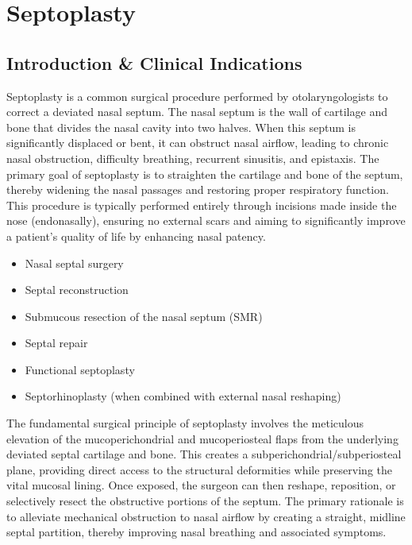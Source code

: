 \chapter{Septoplasty}

\section*{Introduction \& Clinical Indications}
Septoplasty is a common surgical procedure performed by otolaryngologists to correct a deviated nasal septum. The nasal septum is the wall of cartilage and bone that divides the nasal cavity into two halves. When this septum is significantly displaced or bent, it can obstruct nasal airflow, leading to chronic nasal obstruction, difficulty breathing, recurrent sinusitis, and epistaxis. The primary goal of septoplasty is to straighten the cartilage and bone of the septum, thereby widening the nasal passages and restoring proper respiratory function. This procedure is typically performed entirely through incisions made inside the nose (endonasally), ensuring no external scars and aiming to significantly improve a patient's quality of life by enhancing nasal patency.

\begin{itemize}
  \item Nasal septal surgery
  \item Septal reconstruction
  \item Submucous resection of the nasal septum (SMR)
  \item Septal repair
  \item Functional septoplasty
  \item Septorhinoplasty (when combined with external nasal reshaping)
\end{itemize}

The fundamental surgical principle of septoplasty involves the meticulous elevation of the mucoperichondrial and mucoperiosteal flaps from the underlying deviated septal cartilage and bone. This creates a subperichondrial/subperiosteal plane, providing direct access to the structural deformities while preserving the vital mucosal lining. Once exposed, the surgeon can then reshape, reposition, or selectively resect the obstructive portions of the septum. The primary rationale is to alleviate mechanical obstruction to nasal airflow by creating a straight, midline septal partition, thereby improving nasal breathing and associated symptoms.

